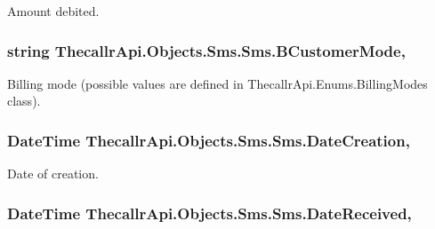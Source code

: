 Amount debited. 

\hypertarget{class_thecallr_api_1_1_objects_1_1_sms_1_1_sms_ad83d4b652366ee9a27466298a0b96b1f}{
\subsubsection[{B\+Customer\+Mode}]{\setlength{\rightskip}{0pt plus 5cm}string Thecallr\+Api.\+Objects.\+Sms.\+Sms.\+B\+Customer\+Mode\hspace{0.3cm}{\ttfamily [get]}, {\ttfamily [set]}}}\label{class_thecallr_api_1_1_objects_1_1_sms_1_1_sms_ad83d4b652366ee9a27466298a0b96b1f}


Billing mode (possible values are defined in Thecallr\+Api.\+Enums.\+Billing\+Modes class). 

\hypertarget{class_thecallr_api_1_1_objects_1_1_sms_1_1_sms_aa5cd1ebfd79ee98aa22dbca23bb2b53f}{
\subsubsection[{Date\+Creation}]{\setlength{\rightskip}{0pt plus 5cm}Date\+Time Thecallr\+Api.\+Objects.\+Sms.\+Sms.\+Date\+Creation\hspace{0.3cm}{\ttfamily [get]}, {\ttfamily [set]}}}\label{class_thecallr_api_1_1_objects_1_1_sms_1_1_sms_aa5cd1ebfd79ee98aa22dbca23bb2b53f}


Date of creation. 

\hypertarget{class_thecallr_api_1_1_objects_1_1_sms_1_1_sms_aa6845032ebb03aaa18b69d7fc5e87367}{
\subsubsection[{Date\+Received}]{\setlength{\rightskip}{0pt plus 5cm}Date\+Time Thecallr\+Api.\+Objects.\+Sms.\+Sms.\+Date\+Received\hspace{0.3cm}{\ttfamily [get]}, {\ttfamily [set]}}}\label{class_thecallr_api_1_1_objects_1_1_sms_1_1_sms_aa6845032ebb03aaa18b69d7fc5e87367}


